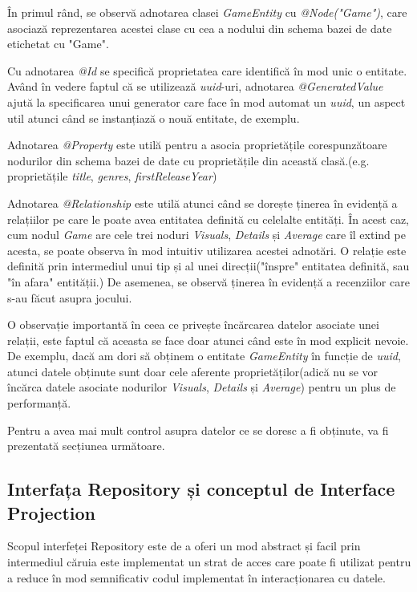 \documentclass[12pt,a4paper]{report}
\begin{document}
În primul rând, se observă adnotarea clasei \emph{GameEntity} cu \emph{@Node("Game")}, care asociază reprezentarea acestei clase cu cea a nodului din schema bazei de date etichetat cu "Game".

Cu adnotarea \emph{@Id} se specifică proprietatea care identifică în mod unic o entitate. Având în vedere faptul că se utilizează \emph{uuid}-uri, adnotarea \emph{@GeneratedValue} ajută la specificarea unui generator care face în mod automat un \emph{uuid}, un aspect util atunci când se instanțiază o nouă entitate, de exemplu.

Adnotarea \emph{@Property} este utilă pentru a asocia proprietățile corespunzătoare nodurilor din schema bazei de date cu proprietățile din această clasă.(e.g. proprietățile \emph{title}, \emph{genres}, \emph{firstReleaseYear})

Adnotarea \emph{@Relationship} este utilă atunci când se dorește ținerea în evidență a relațiilor pe care le poate avea entitatea definită cu celelalte entități. În acest caz, cum nodul \emph{Game} are cele trei noduri \emph{Visuals}, \emph{Details} și \emph{Average} care îl extind pe acesta, se poate observa în mod intuitiv utilizarea acestei adnotări. O relație este definită prin intermediul unui tip și al unei direcții("înspre" entitatea definită, sau "în afara" entității.) De asemenea, se observă ținerea în evidență a recenziilor care s-au făcut asupra jocului.

O observație importantă în ceea ce privește încărcarea datelor asociate unei relații, este faptul că aceasta se face doar atunci când este în mod explicit nevoie. De exemplu, dacă am dori să obținem o entitate \emph{GameEntity} în funcție de \emph{uuid}, atunci datele obținute sunt doar cele aferente proprietăților(adică nu se vor încărca datele asociate nodurilor \emph{Visuals}, \emph{Details} și \emph{Average}) pentru un plus de performanță.

Pentru a avea mai mult control asupra datelor ce se doresc a fi obținute, va fi prezentată secțiunea următoare.

\subsection{Interfața Repository și conceptul de Interface Projection}

Scopul interfeței Repository este de a oferi un mod abstract și facil prin intermediul căruia este implementat un strat de acces care poate fi utilizat pentru a reduce în mod semnificativ codul implementat în interacționarea cu datele. \cite{22}
\end{document}

